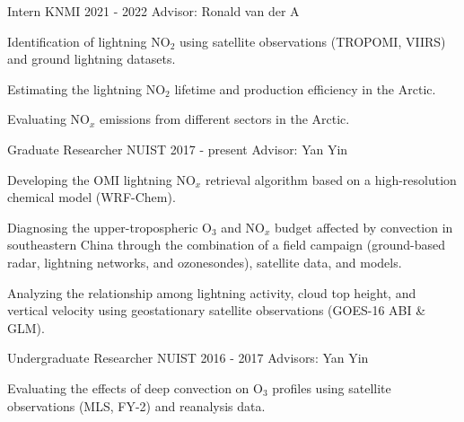 

\begin{cventries}

  \cventry
    {Intern} %
    {KNMI} %
    {2021 - 2022} %
    {Advisor: Ronald van der A} %
    {
      \begin{cvitems} %
        \item {Identification of lightning NO$_2$ using satellite observations (TROPOMI, VIIRS) and ground lightning datasets.}
        \item {Estimating the lightning NO$_2$ lifetime and production efficiency in the Arctic.}
        \item {Evaluating NO$_x$ emissions from different sectors in the Arctic.}
      \end{cvitems}
    }

  \cventry
    {Graduate Researcher} %
    {NUIST} %
    {2017 - present} %
    {Advisor: Yan Yin} %
    {
      \begin{cvitems} %
        \item {Developing the OMI lightning NO$_x$ retrieval algorithm based on a high-resolution chemical model (WRF-Chem).}
        \item {Diagnosing the upper-tropospheric O$_3$ and NO$_x$ budget affected by convection in southeastern China
        through the combination of a field campaign (ground-based radar, lightning networks, and ozonesondes), satellite data, and models.}
        \item {Analyzing the relationship among lightning activity, cloud top height, and vertical velocity using geostationary satellite observations (GOES-16 ABI \& GLM).}
      \end{cvitems}
    }

  \cventry
    {Undergraduate Researcher} %
    {NUIST} %
    {2016 - 2017} %
    {Advisors: Yan Yin} %
    {
      \begin{cvitems} %
        \item {Evaluating the effects of deep convection on O$_3$ profiles using satellite observations (MLS, FY-2) and reanalysis data.}
      \end{cvitems}
    }


\end{cventries}
